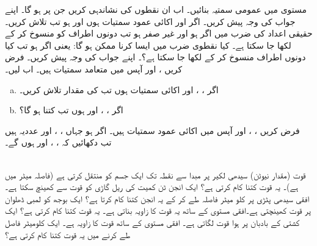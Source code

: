مستوی  میں عمومی سمتیہ  بنائیں۔ اب ان نقطوں  کی نشاندہی کریں جن پر  ہو گا۔ اپنے جواب کی وجہ پیش کریں۔
اگر  اور  اکائی عمود سمتیات ہوں اور  ہو تب  تلاش کریں۔
\\
حقیقی اعداد کی  ضرب میں اگر  ہو اور  غیر صفر ہو تب دونوں اطراف  کو منسوخ کر کے  لکھا جا سکتا ہے۔ کیا نقطوی ضرب میں ایسا کرنا ممکن ہو گا: یعنی اگر  ہو تب کیا دونوں اطراف  منسوخ کر کے  لکھا جا سکتا ہے؟۔ اپنے جواب کی وجہ پیش کریں۔
فرض کریں ،  اور  آپس میں متعامد سمتیات ہیں۔ اب  لیں۔
\begin{enumerate}[a.]
\item
اگر ، ،  اور  اکائی سمتیات ہوں تب  کی مقدار  تلاش کریں۔
\item
اگر ، ،  اور  ہوں تب  کتنا ہو گا؟
\end{enumerate}
فرض کریں ، ،  اور  آپس میں اکائی عمود سمتیات ہیں۔ اگر  ہو جہاں ، ،  اور  عددیہ ہیں تب دکھائیں کہ ،  ، اور  ہوں گے۔ 

\\
قوت  (مقدار  نیوٹن) سیدھی لکیر پر مبدا سے نقطہ  تک  ایک جسم کو منتقل کرتی  ہے (فاصلہ میٹر میں ہے)۔ یہ قوت کتنا کام کرتی ہے؟
ایک   انجن  ٹن کمیت کی ریل گاڑی کو  قوت سے کھینچ سکتا ہے۔  افقی سیدھی پٹڑی پر  کلو میٹر فاصلہ طے کر کے یہ انجن کتنا کام کرتا ہے؟
ایک بوجھ کو  لمبی ڈھلوان پر  قوت کھینچتی ہے۔افقی مستوی کے ساتھ یہ قوت  کا زاویہ بناتی ہے۔ یہ قوت کتنا کام کرتی ہے؟ 
ایک کشتی کے  بادبان پر ہوا  قوت لگاتی ہے۔ افقی مستوی کے ساتھ قوت کا زاویہ  ہے۔ ایک کلومیٹر فاصل طے کرنے میں یہ قوت کتنا کام کرتی ہے؟


